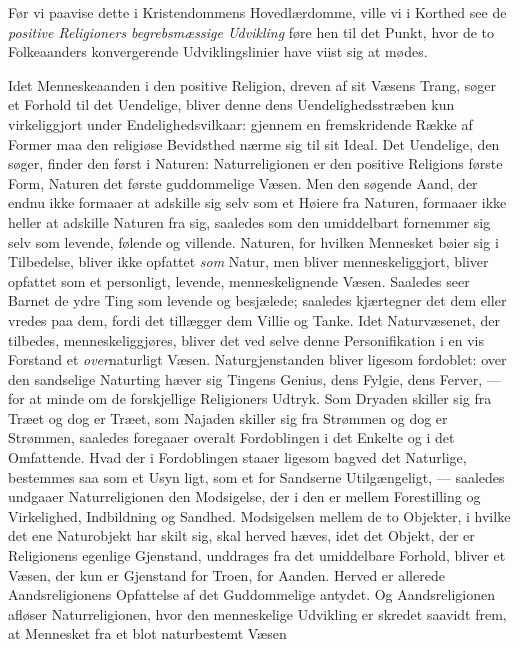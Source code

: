 \documentclass[12pt,a4paper,openany]{book}
\newcommand{\opage}[1]{\marginnote{\footnotesize\textit{[#1]}}}
\begin{document}
Før vi paavise dette i Kristendommens Hovedlærdomme,
ville vi i Korthed see de \emph{positive Religioners begrebsmæssige
Udvikling} føre hen til det Punkt, hvor de to
Folkeaanders konvergerende Udviklingslinier have viist sig at
mødes.

Idet Menneskeaanden i den positive Religion, dreven af
sit Væsens Trang, søger et Forhold til det Uendelige, bliver
denne dens Uendelighedsstræben kun virkeliggjort under Endelighedsvilkaar:
gjennem en fremskridende Række af Former
maa den religiøse Bevidsthed nærme sig til sit Ideal. Det
Uendelige, den søger, finder den først i Naturen: Naturreligionen
er den positive Religions første Form, Naturen
det første guddommelige Væsen. Men den søgende Aand, der
endnu ikke formaaer at adskille sig selv som et Høiere fra
Naturen, formaaer ikke heller at adskille Naturen fra sig, saaledes
som den umiddelbart fornemmer sig selv som levende,
følende og villende. Naturen, for hvilken Mennesket bøier
sig i Tilbedelse, bliver ikke opfattet \emph{som} Natur, men bliver
menneskeliggjort, bliver opfattet som et personligt, levende,
menneskelignende Væsen. Saaledes seer Barnet de ydre Ting
som levende og besjælede; saaledes kjærtegner det dem eller
vredes paa dem, fordi det tillægger dem Villie og Tanke.
Idet Naturvæsenet, der tilbedes, menneskeliggjøres, bliver
det ved selve denne Personifikation i en vis Forstand et
\emph{over}naturligt Væsen. Naturgjenstanden bliver ligesom fordoblet:
over den sandselige Naturting hæver sig Tingens
Genius, dens Fylgie, dens Ferver, --- for at minde om de
forskjellige Religioners Udtryk. Som Dryaden skiller sig fra
Træet og dog er Træet, som Najaden skiller sig fra Strømmen
og dog er Strømmen, saaledes foregaaer overalt Fordoblingen i
det Enkelte og i det Omfattende. Hvad der i Fordoblingen staaer
ligesom bagved det Naturlige, bestemmes saa som et Usyn%
\opage{448}ligt, som et for Sandserne Utilgængeligt, --- saaledes undgaaer
Naturreligionen den Modsigelse, der i den er mellem
Forestilling og Virkelighed, Indbildning og Sandhed. Modsigelsen
mellem de to Objekter, i hvilke det ene Naturobjekt
har skilt sig, skal herved hæves, idet det Objekt, der er Religionens
egenlige Gjenstand, unddrages fra det umiddelbare
Forhold, bliver et Væsen, der kun er Gjenstand for Troen,
for Aanden. Herved er allerede Aandsreligionens Opfattelse
af det Guddommelige antydet. Og Aandsreligionen afløser
Naturreligionen, hvor den menneskelige Udvikling er skredet
saavidt frem, at Mennesket fra et blot naturbestemt Væsen
\end{document}
